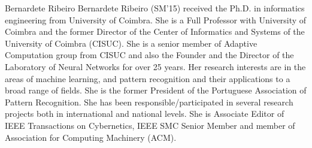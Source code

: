 \documentclass{ieeeaccess}
\begin{document}
\begin{IEEEbiography}
{Bernardete Ribeiro}
Bernardete Ribeiro (SM'15) received the Ph.D. in informatics engineering from University of Coimbra. She is a Full Professor with University of Coimbra and the former Director of the Center of Informatics and Systems of the University of Coimbra (CISUC). She is a senior member of Adaptive Computation group from CISUC and also the Founder and the Director of the Laboratory of  Neural Networks for over 25 years. Her research interests are in the areas of machine learning, and pattern recognition and their applications to a broad range of fields. She is the former President of the Portuguese Association of Pattern Recognition. She has been responsible/participated in several research projects both in international and national levels.  She is Associate Editor of IEEE Transactions on Cybernetics, IEEE SMC Senior Member and member of Association for Computing Machinery (ACM).
\end{IEEEbiography}
\EOD
\end{document}
